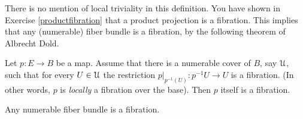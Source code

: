 There is no mention of local triviality in this definition.
You have shown in Exercise \ref{productfibration} that a product projection 
is a fibration.
This implies that any (numerable) fiber bundle is a fibration, 
by the following theorem of Albrecht Dold.
\begin{theorem}[Dold]
    Let $p:E\to B$ be a map. Assume that there is a numerable cover of $B$, 
say $\mathcal U$, such that for every $U\in\mathcal U$
    the restriction $p|_{p^{-1}(U)}:p^{-1}U\to U$ is a fibration.
    (In other words, $p$ is \emph{locally} a fibration over the base).
    Then $p$ itself is a fibration.
\end{theorem}
\begin{corollary}
Any numerable fiber bundle is a fibration.
\end{corollary}

